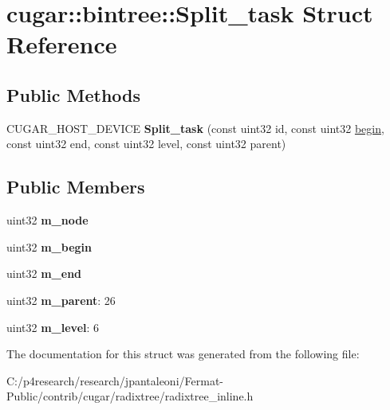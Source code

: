 \hypertarget{structcugar_1_1bintree_1_1_split__task}{}\section{cugar\+:\+:bintree\+:\+:Split\+\_\+task Struct Reference}
\label{structcugar_1_1bintree_1_1_split__task}
\subsection*{Public Methods}
\begin{DoxyCompactItemize}
\item 
\mbox{\label{structcugar_1_1bintree_1_1_split__task_a9ddc94c11e0072b9ec07a162d9bdf15b}} 
C\+U\+G\+A\+R\+\_\+\+H\+O\+S\+T\+\_\+\+D\+E\+V\+I\+CE {\bfseries Split\+\_\+task} (const uint32 id, const uint32 \hyperlink{namespacecugar_a2121df08f967e232ea5fe0ee378dee67}{begin}, const uint32 end, const uint32 level, const uint32 parent)
\end{DoxyCompactItemize}
\subsection*{Public Members}
\begin{DoxyCompactItemize}
\item 
\mbox{\label{structcugar_1_1bintree_1_1_split__task_ab1b12072c419622e611ba7fae4bf86fe}} 
uint32 {\bfseries m\+\_\+node}
\item 
\mbox{\label{structcugar_1_1bintree_1_1_split__task_a32996573d8fbc786affa0730d974856e}} 
uint32 {\bfseries m\+\_\+begin}
\item 
\mbox{\label{structcugar_1_1bintree_1_1_split__task_a774c1102890c37e67b85fd8fd73a3ede}} 
uint32 {\bfseries m\+\_\+end}
\item 
\mbox{\label{structcugar_1_1bintree_1_1_split__task_a4f5d18d1c87ebe4fe8b6098d1ccd571a}} 
uint32 {\bfseries m\+\_\+parent}\+: 26
\item 
\mbox{\label{structcugar_1_1bintree_1_1_split__task_a4c8570d1f5aa3ef5effc948bea0c7f0e}} 
uint32 {\bfseries m\+\_\+level}\+: 6
\end{DoxyCompactItemize}


The documentation for this struct was generated from the following file\+:\begin{DoxyCompactItemize}
\item 
C\+:/p4research/research/jpantaleoni/\+Fermat-\/\+Public/contrib/cugar/radixtree/radixtree\+\_\+inline.\+h\end{DoxyCompactItemize}
